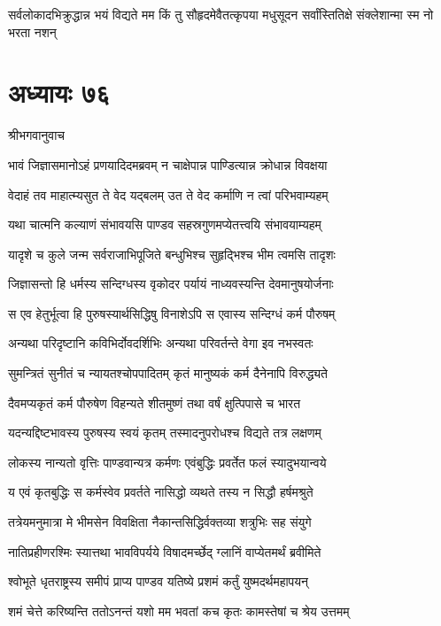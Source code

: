 \threelineshloka
{सर्वलोकादभिक्रुद्धान्न भयं विद्यते मम}
{किं तु सौहृदमेवैतत्कृपया मधुसूदन}
{सर्वांस्तितिक्षे संक्लेशान्मा स्म नो भरता नशन्}


\chapter{अध्यायः ७६}
\twolineshloka
{श्रीभगवानुवाच}
{}


\twolineshloka
{भावं जिज्ञासमानोऽहं प्रणयादिदमब्रवम्}
{न चाक्षेपान्न पाण्डित्यान्न क्रोधान्न विवक्षया}


\twolineshloka
{वेदाहं तव माहात्म्यसुत ते वेद यद्बलम्}
{उत ते वेद कर्माणि न त्वां परिभवाम्यहम्}


\twolineshloka
{यथा चात्मनि कल्याणं संभावयसि पाण्डव}
{सहस्रगुणमप्येतत्त्वयि संभावयाम्यहम्}


\twolineshloka
{यादृशे च कुले जन्म सर्वराजाभिपूजिते}
{बन्धुभिश्च सुहृद्भिश्च भीम त्वमसि तादृशः}


\twolineshloka
{जिज्ञासन्तो हि धर्मस्य सन्दिग्धस्य वृकोदर}
{पर्यायं नाध्यवस्यन्ति देवमानुषयोर्जनाः}


\twolineshloka
{स एव हेतुर्भूत्वा हि पुरुषस्यार्थसिद्धिषु}
{विनाशेऽपि स एवास्य सन्दिग्धं कर्म पौरुषम्}


\twolineshloka
{अन्यथा परिदृष्टानि कविभिर्दोवदर्शिभिः}
{अन्यथा परिवर्तन्ते वेगा इव नभस्वतः}


\twolineshloka
{सुमन्त्रितं सुनीतं च न्यायतश्चोपपादितम्}
{कृतं मानुष्यकं कर्म दैनेनापि विरुद्ध्यते}


\twolineshloka
{दैवमप्यकृतं कर्म पौरुषेण विहन्यते}
{शीतमुष्णं तथा वर्षं क्षुत्पिपासे च भारत}


\twolineshloka
{यदन्यद्दिष्टभावस्य पुरुषस्य स्वयं कृतम्}
{तस्मादनुपरोधश्च विद्यते तत्र लक्षणम्}


\twolineshloka
{लोकस्य नान्यतो वृत्तिः पाण्डवान्यत्र कर्मणः}
{एवंबुद्धिः प्रवर्तेत फलं स्यादुभयान्वये}


\twolineshloka
{य एवं कृतबुद्धिः स कर्मस्वेव प्रवर्तते}
{नासिद्धो व्यथते तस्य न सिद्धौ हर्षमश्रुते}


\twolineshloka
{तत्रेयमनुमात्रा मे भीमसेन विवक्षिता}
{नैकान्तसिद्धिर्वक्तव्या शत्रुभिः सह संयुगे}


\twolineshloka
{नातिप्रहीणरश्मिः स्यात्तथा भावविपर्यये}
{विषादमर्च्छेद् ग्लानिं वाप्येतमर्थं ब्रवीमिते}


\twolineshloka
{श्वोभूते धृतराष्ट्रस्य समीपं प्राप्य पाण्डव}
{यतिष्ये प्रशमं कर्तुं युष्मदर्थमहापयन्}


\twolineshloka
{शमं चेत्ते करिष्यन्ति ततोऽनन्तं यशो मम}
{भवतां कच कृतः कामस्तेषां च श्रेय उत्तमम्}


